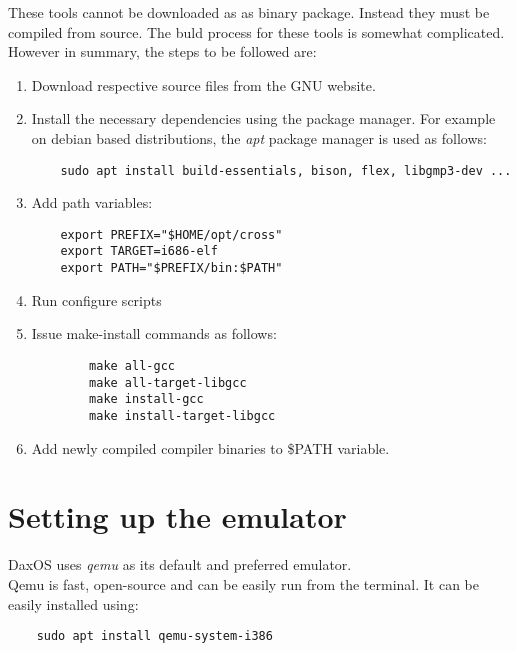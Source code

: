 These tools cannot be downloaded as as binary package. Instead they must be compiled from source.
The buld process for these tools is somewhat complicated.\\
However in summary, the steps to be followed are:
\begin{enumerate}
    \item Download respective source files from the GNU website.

    \item Install the necessary dependencies using the package manager.
    For example on debian based distributions, the \textit{apt} package manager is used as follows:
    \begin{lstlisting}
    sudo apt install build-essentials, bison, flex, libgmp3-dev ...
    \end{lstlisting}

    \item Add path variables:
    \begin{lstlisting}
    export PREFIX="$HOME/opt/cross"
    export TARGET=i686-elf
    export PATH="$PREFIX/bin:$PATH"
    \end{lstlisting}

    \item Run configure scripts
    
    \item Issue make-install commands as follows:
    \begin{lstlisting}
        make all-gcc
        make all-target-libgcc
        make install-gcc
        make install-target-libgcc
    \end{lstlisting}

    \item Add newly compiled compiler binaries to \$PATH variable.

\end{enumerate}
\pagebreak

\section{Setting up the emulator}\label{section:Setting up the emulator}
DaxOS uses \textit{qemu} as its default and preferred emulator.\\
Qemu is fast, open-source and can be easily run from the terminal.
It can be easily installed using:
\begin{lstlisting}
    sudo apt install qemu-system-i386
\end{lstlisting}

